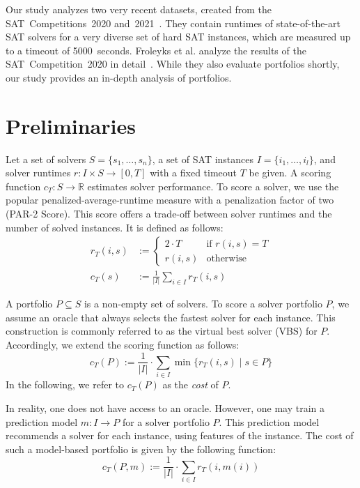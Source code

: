 \documentclass[a4paper,USenglish,pdfa]{lipics-v2021} %
\begin{document}
Our study analyzes two very recent datasets, created from the SAT~Competitions~2020 and~2021~\cite{balyo2020proceedings,balyo2021proceedings}. 
They contain runtimes of state-of-the-art SAT solvers for a very diverse set of hard SAT instances, which are measured up to a timeout of 5000~seconds.
Froleyks et al. analyze the results of the SAT~Competition~2020 in detail~\cite{SC2020:AIJ}.
While they also evaluate portfolios shortly, our study provides an in-depth analysis of portfolios.

\section{Preliminaries}
\label{sec:preliminaries}

Let a set of solvers $S = \{s_1, \dots, s_n\}$, a set of SAT instances $I = \{i_1, \dots, i_l\}$, and solver runtimes $r: I \times S \rightarrow [0, T]$ with a fixed timeout $T$ be given.
A scoring function $c_T: S \rightarrow \mathbb{R}$ estimates solver performance. 
To score a solver, we use the popular penalized-average-runtime measure with a penalization factor of two (PAR-2 Score). 
This score offers a trade-off between solver runtimes and the number of solved instances.
It is defined as follows:%
\begin{align}
r_T(i,s) &:= \begin{cases}
	2 \cdot T & \text{if }r(i,s) = T\\
	r(i,s) & \text{otherwise}
\end{cases} \tag*{Penalized Runtimes}\\[.5em]
c_T(s) &:= \frac{1}{|I|} \sum_{i \in I}{r_T(i,s)} \tag*{PAR-2 Score}
\end{align}

A portfolio $P \subseteq S$ is a non-empty set of solvers.
To score a solver portfolio $P$, we assume an oracle that always selects the fastest solver for each instance. 
This construction is commonly referred to as the virtual best solver (VBS) for $P$. 
Accordingly, we extend the scoring function as follows:%
\[
	c_{T}(P) := \frac{1}{|I|} \cdot \sum\limits_{i \in I}{\min\{r_T(i,s) \mid s \in P\}}
\]
In the following, we refer to $c_{T}(P)$ as the \emph{cost} of $P$. 

In reality, one does not have access to an oracle.
However, one may train a prediction model $m: I \rightarrow P$ for a solver portfolio $P$.
This prediction model recommends a solver for each instance, using features of the instance. 
The cost of such a model-based portfolio is given by the following function:%
\[
	c_{T}(P,m) := \frac{1}{|I|} \cdot \sum\limits_{i \in I}{r_T(i,m(i))}
\]
\end{document}
